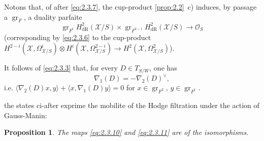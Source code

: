 \documentclass[12pt,a4paper]{article}
\theoremstyle{plain}
\newtheorem{proposition}[theorem]{Proposition}
\theoremstyle{definition}
\theoremstyle{remark}
\DeclareMathOperator{\gr}{gr}
\begin{document}
Notons that, of after \eqref{eq:2.3.7}, the cup-product \ref{prop:2.2}~c) induces, by passage a $\gr_F$, a duality parfaite
\begin{equation}\label{eq:2.3.13}
\gr_{F^i} H^2_{\mathrm{dR}}(\mathcal{X}/S) \times \gr_{F^{2-i}} H^2_{\mathrm{dR}}(\mathcal{X}/S) \to \mathcal{O}_S
\end{equation}
(corresponding by \eqref{eq:2.3.6} to the cup-product $H^{2-i}(\mathcal{X}, \Omega^i_{\mathcal{X}/S}) \otimes H^i(\mathcal{X}, \Omega^{2-i}_{\mathcal{X}/S}) \to H^2(\mathcal{X}, \Omega^2_{\mathcal{X}/S})$).

It follows of \eqref{eq:2.3.3} that, for every $D \in T_{S/W}$, one has
\begin{equation}\label{eq:2.3.14}
\nabla_1(D) = -\nabla_2(D)^{\vee},
\end{equation}
i.e. $\langle \nabla_2(D)x, y \rangle + \langle x, \nabla_1(D)y \rangle = 0$ for $x \in \gr_{F^2}$, $y \in \gr_{F^1}$.

the states ci-after exprime the mobilite of the Hodge filtration under the action of Gauss-Manin:

\begin{proposition}\label{prop:2.4}
The maps \eqref{eq:2.3.10} and \eqref{eq:2.3.11} are of the isomorphisms.
\end{proposition}
\end{document}
